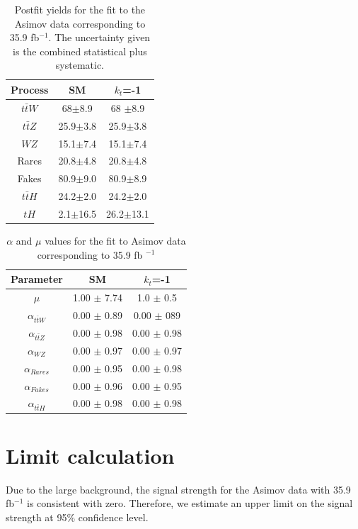 	\begin{table}[ht]
		\centering
		\caption{Postfit yields for the fit to the Asimov data corresponding to 35.9 fb$^{-1}$. The uncertainty given is the combined statistical plus systematic.}
		\begin{tabular}{ccc}
			\hline
			Process & SM & $k_{t}$=-1 \\
			\hline
			$t\bar{t}W$ & 68$\pm$8.9& 68 $\pm$8.9 \\
			$t\bar{t}Z$ & 25.9$\pm$3.8&25.9$\pm$3.8\\
			$WZ$ & 15.1$\pm$7.4& 15.1$\pm$7.4\\
			Rares & 20.8$\pm$4.8& 20.8$\pm$4.8 \\
			Fakes & 80.9$\pm$9.0& 80.9$\pm$8.9 \\
			$t\bar{t}H$ & 24.2$\pm$2.0 & 24.2$\pm$2.0 \\
			\hline
			$tH$& 2.1$\pm$16.5 &26.2$\pm$13.1 
		\end{tabular}
		\label{table1}
	\end{table}
	\begin{table}[ht!]
		\small
		\centering
		\caption{$\alpha$ and $\mu$ values for the fit to Asimov data corresponding to 35.9 fb $^{-1}$}
		\begin{tabular}{ccc}
			\hline
			Parameter & SM &$k_t$=-1\\
			\hline
			$\mu$ & 1.00 $\pm$ 7.74& 1.0 $\pm$ 0.5\\
			$\alpha_{t\bar{t}W}$& 0.00 $\pm$ 0.89& 0.00 $\pm$ 089\\
			$\alpha_{t\bar{t}Z}$ & 0.00 $\pm$ 0.98& 0.00 $\pm$ 0.98\\
			$\alpha_{WZ}$ & 0.00 $\pm$ 0.97& 0.00 $\pm$ 0.97\\
			$\alpha_{Rares}$ &0.00 $\pm$ 0.95&0.00 $\pm$ 0.98 \\
			$\alpha_{Fakes}$ & 0.00 $\pm$ 0.96& 0.00 $\pm$ 0.95\\
			$\alpha_{t\bar{t}H}$ &0.00 $\pm$ 0.98& 0.00 $\pm$ 0.98\\
		\end{tabular}
		\label{parameters}
	\end{table}
	
	\pagebreak

	\section{Limit calculation}
	Due to the large background, the signal strength for the Asimov data with 35.9 fb$^{-1}$ is consistent with zero.
	Therefore, we estimate an upper limit on the signal strength at 95$\%$ confidence level.
	
